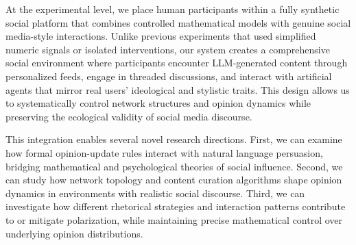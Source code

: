 At the experimental level, we place human participants within a fully synthetic social platform that combines controlled mathematical models with genuine social media-style interactions. Unlike previous experiments that used simplified numeric signals or isolated interventions, our system creates a comprehensive social environment where participants encounter LLM-generated content through personalized feeds, engage in threaded discussions, and interact with artificial agents that mirror real users' ideological and stylistic traits. This design allows us to systematically control network structures and opinion dynamics while preserving the ecological validity of social media discourse.

This integration enables several novel research directions. First, we can examine how formal opinion-update rules interact with natural language persuasion, bridging mathematical and psychological theories of social influence. Second, we can study how network topology and content curation algorithms shape opinion dynamics in environments with realistic social discourse. Third, we can investigate how different rhetorical strategies and interaction patterns contribute to or mitigate polarization, while maintaining precise mathematical control over underlying opinion distributions.


